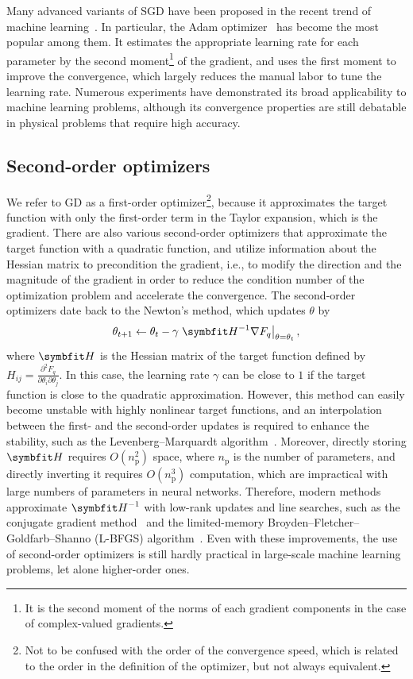 Many advanced variants of SGD have been proposed in the recent trend of machine learning~\cite{kashyap2022survey}. In particular, the Adam optimizer~\cite{kingma2014adam} has become the most popular among them. It estimates the appropriate learning rate for each parameter by the second moment\footnote{It is the second moment of the norms of each gradient components in the case of complex-valued gradients.} of the gradient, and uses the first moment to improve the convergence, which largely reduces the manual labor to tune the learning rate. Numerous experiments have demonstrated its broad applicability to machine learning problems, although its convergence properties are still debatable in physical problems that require high accuracy.

\subsection{Second-order optimizers}
\label{sec:ngd}

We refer to GD as a first-order optimizer\footnote{Not to be confused with the order of the convergence speed, which is related to the order in the definition of the optimizer, but not always equivalent.}, because it approximates the target function with only the first-order term in the Taylor expansion, which is the gradient. There are also various second-order optimizers that approximate the target function with a quadratic function, and utilize information about the Hessian matrix to precondition the gradient, i.e., to modify the direction and the magnitude of the gradient in order to reduce the condition number of the optimization problem and accelerate the convergence. The second-order optimizers date back to the Newton's method, which updates $\theta$ by
\begin{equation}
\theta_{t + 1} \gets \theta_t - \gamma \left. \mH^{-1} \nabla F_q \right|_{\theta = \theta_t},
\label{eq:newton}
\end{equation}
where $\mH$ is the Hessian matrix of the target function defined by $H_{i j} = \frac{\partial^2 F_q}{\partial \theta_i \partial \theta_j}$. In this case, the learning rate $\gamma$ can be close to $1$ if the target function is close to the quadratic approximation. However, this method can easily become unstable with highly nonlinear target functions, and an interpolation between the first- and the second-order updates is required to enhance the stability, such as the Levenberg--Marquardt algorithm~\cite{levenberg1944method}. Moreover, directly storing $\mH$ requires $O(n_\text{p}^2)$ space, where $n_\text{p}$ is the number of parameters, and directly inverting it requires $O(n_\text{p}^3)$ computation, which are impractical with large numbers of parameters in neural networks. Therefore, modern methods approximate $\mH^{-1}$ with low-rank updates and line searches, such as the conjugate gradient method~\cite{fletcher1964function} and the limited-memory Broyden--Fletcher--Goldfarb--Shanno (L-BFGS) algorithm~\cite{liu1989limited}. Even with these improvements, the use of second-order optimizers is still hardly practical in large-scale machine learning problems, let alone higher-order ones.


